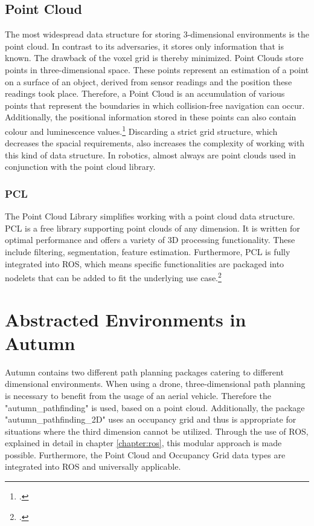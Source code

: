\subsection{Point Cloud}
The most widespread data structure for storing 3-dimensional environments is the point cloud. In contrast to its adversaries, it stores only information that is known. The drawback of the voxel grid is thereby minimized. Point Clouds store points in three-dimensional space. These points represent an estimation of a point on a surface of an object, derived from sensor readings and the position these readings took place. Therefore, a Point Cloud is an accumulation of various points that represent the boundaries in which collision-free navigation can occur.
Additionally, the positional information stored in these points can also contain colour and luminescence values.\footcite{tech27PointCloud2018}\newline
Discarding a strict grid structure, which decreases the spacial requirements, also increases the complexity of working with this kind of data structure. In robotics, almost always are point clouds used in conjunction with the point cloud library.

\subsubsection{PCL}
The Point Cloud Library simplifies working with a point cloud data structure. PCL is a free library supporting point clouds of any dimension. It is written for optimal performance and offers a variety of 3D processing functionality. These include filtering, segmentation, feature estimation. Furthermore, PCL is fully integrated into ROS, which means specific functionalities are packaged into nodelets that can be added to fit the underlying use case.\footcite{ConselhoNacionaldeDesenvolvimentoCientificoeTecnologico1995}

\section{Abstracted Environments in Autumn}
Autumn contains two different path planning packages catering to different dimensional environments. When using a drone, three-dimensional path planning is necessary to benefit from the usage of an aerial vehicle. Therefore the "autumn\_pathfinding" is used, based on a point cloud. Additionally, the package "autumn\_pathfinding\_2D" uses an occupancy grid and thus is appropriate for situations where the third dimension cannot be utilized.\newline
Through the use of ROS, explained in detail in chapter \ref{chapter:ros}, this modular approach is made possible. Furthermore, the Point Cloud and Occupancy Grid data types are integrated into ROS and universally applicable.   

